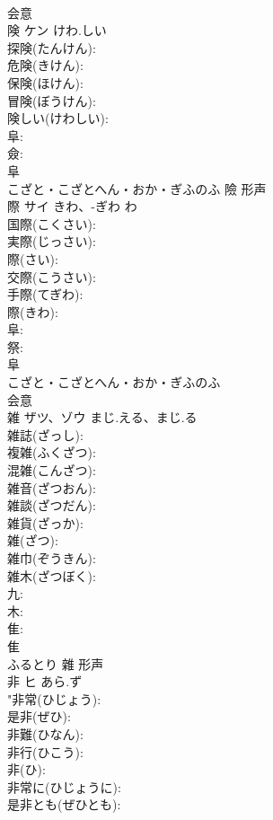 \documentclass[8pt]{extreport}
\begin{document}
\begin{CJK}{UTF8}{min}
\\	会意 
\\	険	ケン	けわ.しい		
\\	探険(たんけん): 
\\	危険(きけん): 
\\	保険(ほけん): 
\\	冒険(ぼうけん): 
\\	険しい(けわしい): 
\\	阜: 
\\	僉: 
\\	阜	
\\	こざと・こざとへん・おか・ぎふのふ	險	形声 
\\	際	サイ	きわ、-ぎわ	わ	
\\	国際(こくさい): 
\\	実際(じっさい): 
\\	際(さい): 
\\	交際(こうさい): 
\\	手際(てぎわ): 
\\	際(きわ): 
\\	阜: 
\\	祭: 
\\	阜	
\\	こざと・こざとへん・おか・ぎふのふ	
\\	会意 
\\	雑	ザツ、ゾウ	まじ.える、まじ.る		
\\	雑誌(ざっし): 
\\	複雑(ふくざつ): 
\\	混雑(こんざつ): 
\\	雑音(ざつおん): 
\\	雑談(ざつだん): 
\\	雑貨(ざっか): 
\\	雑(ざつ): 
\\	雑巾(ぞうきん): 
\\	雑木(ざつぼく): 
\\	九: 
\\	木: 
\\	隹: 
\\	隹	
\\	ふるとり	雜	形声 
\\	非	ヒ	あら.ず		
\\	"非常(ひじょう): 
\\	是非(ぜひ): 
\\	非難(ひなん): 
\\	非行(ひこう): 
\\	非(ひ): 
\\	非常に(ひじょうに): 
\\	是非とも(ぜひとも): 

\end{CJK}
\end{document}
